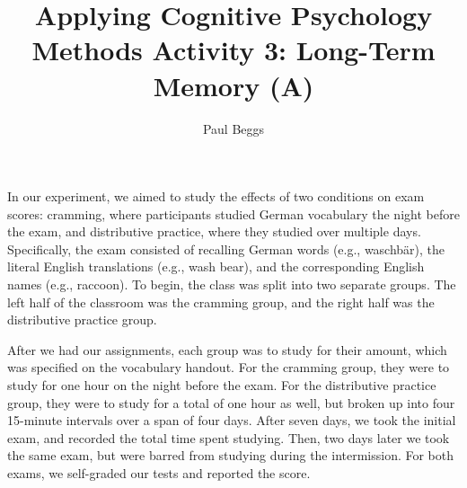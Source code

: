 \documentclass[stu,12pt,floatsintext]{apa7}
\title{Applying Cognitive Psychology Methods Activity 3: Long-Term Memory (A)} %
\author{Paul Beggs}
\begin{document}






\maketitle %

In our experiment, we aimed to study the effects of two conditions on exam scores: cramming, where participants studied German vocabulary the night before the exam, and distributive practice, where they studied over multiple days. Specifically, the exam consisted of recalling German words (e.g., waschb\"{a}r), the literal English translations (e.g., wash bear), and the corresponding English names (e.g., raccoon). To begin, the class was split into two separate groups. The left half of the classroom was the cramming group, and the right half was the distributive practice group. 

After we had our assignments, each group was to study for their amount, which was specified on the vocabulary handout. For the cramming group, they were to study for one hour on the night before the exam. For the distributive practice group, they were to study for a total of one hour as well, but broken up into four 15-minute intervals over a span of four days. After seven days, we took the initial exam, and recorded the total time spent studying. Then, two days later we took the same exam, but were barred from studying during the intermission. For both exams, we self-graded our tests and reported the score.
\end{document}
